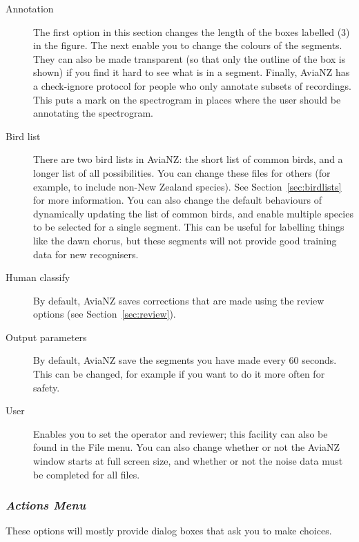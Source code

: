 \documentclass{article}
\begin{document}
\begin{description}
\begin{description}
\item[Annotation] The first option in this section changes the length of the boxes labelled (3) in the figure. The next enable you to change the colours of the segments. They can also be made transparent (so that only the outline of the box is shown) if you find it hard to see what is in a segment. Finally, AviaNZ has a check-ignore protocol for people who only annotate subsets of recordings. This puts a mark on the spectrogram in places where the user should be annotating the spectrogram. 
\item[Bird list] There are two bird lists in AviaNZ: the short list of common birds, and a longer list of all possibilities. You can change these files for others (for example, to include non-New Zealand species). See Section~\ref{sec:birdlists} for more information. You can also change the default behaviours of dynamically updating the list of common birds, and enable multiple species to be selected for a single segment. This can be useful for labelling things like the dawn chorus, but these segments will not provide good training data for new recognisers. 
\item[Human classify] By default, AviaNZ saves corrections that are made using the review options (see Section~\ref{sec:review}). 
\item[Output parameters] By default, AviaNZ save the segments you have made every 60 seconds. This can be changed, for example if you want to do it more often for safety.
\item[User] Enables you to set the operator and reviewer; this facility can also be found in the File menu. You can also change whether or not the AviaNZ window starts at full screen size, and whether or not the noise data must be completed for all files. 
\end{description}
\end{description}

\subsubsection{{\em Actions Menu}}
\label{sec:action}

These options will mostly provide dialog boxes that ask you to make choices. 
\end{document}
